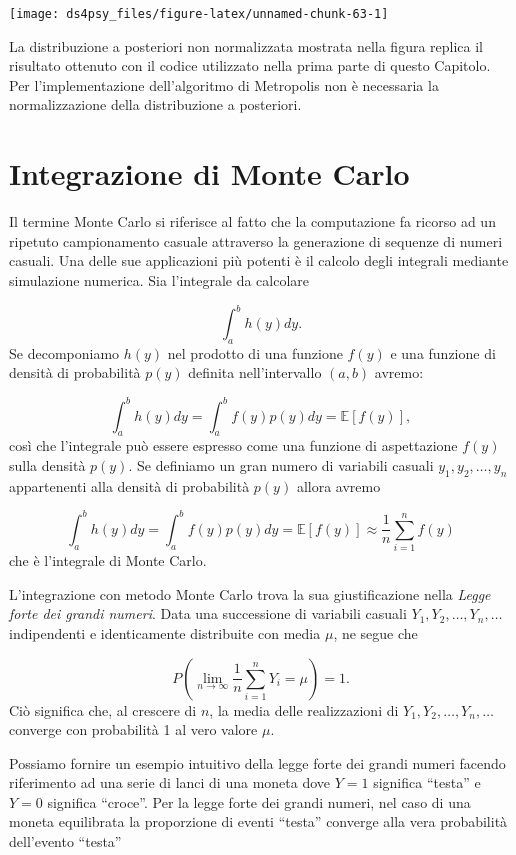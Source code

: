 \documentclass[
  11pt,
]{krantz}
\newcommand{\E}{\mathbb{E}} %
\theoremstyle{definition}
\theoremstyle{definition}
\theoremstyle{definition}
\theoremstyle{definition}
\theoremstyle{remark}
\begin{document}
\begin{center}\texttt{[image: ds4psy\_files/figure-latex/unnamed-chunk-63-1]} \end{center}

La distribuzione a posteriori non normalizzata mostrata nella figura replica il risultato ottenuto con il codice utilizzato nella prima parte di questo Capitolo. Per l'implementazione dell'algoritmo di Metropolis non è necessaria la normalizzazione della distribuzione a posteriori.

\hypertarget{integration-mc}{%
\chapter{Integrazione di Monte Carlo}\label{integration-mc}}

Il termine Monte Carlo si riferisce al fatto che la computazione fa ricorso ad un ripetuto campionamento casuale attraverso la generazione di sequenze di numeri casuali. Una delle sue applicazioni più potenti è il calcolo degli integrali mediante simulazione numerica. Sia l'integrale da calcolare

\[
\int_a^b h(y) dy.
\] Se decomponiamo \(h(y)\) nel prodotto di una funzione \(f(y)\) e una funzione di densità di probabilità \(p(y)\) definita nell'intervallo \((a, b)\) avremo:

\[
\int_a^b h(y) dy = \int_a^b f(y) p(y) dy = \E[f(y)],
\] così che l'integrale può essere espresso come una funzione di aspettazione \(f(y)\) sulla densità \(p(y)\). Se definiamo un gran numero di variabili casuali \(y_1, y_2, \dots, y_n\) appartenenti alla densità di probabilità \(p(y)\) allora avremo

\[
\int_a^b h(y) dy = \int_a^b f(y) p(y) dy = \E[f(y)] \approx \frac{1}{n}\sum_{i=1}^n f(y)
\] che è l'integrale di Monte Carlo.

L'integrazione con metodo Monte Carlo trova la sua giustificazione nella \emph{Legge forte dei grandi numeri}. Data una successione di variabili casuali \(Y_{1}, Y_{2},\dots, Y_{n},\dots\) indipendenti e identicamente distribuite con media \(\mu\), ne segue che

\[
P\left( \lim_{n \rightarrow \infty} \frac{1}{n} \sum_{i=1}^n Y_i = \mu \right) = 1.
\] Ciò significa che, al crescere di \(n\), la media delle realizzazioni di \(Y_{1}, Y_{2},\dots, Y_{n},\dots\) converge con probabilità 1 al vero valore \(\mu\).

Possiamo fornire un esempio intuitivo della legge forte dei grandi numeri facendo riferimento ad una serie di lanci di una moneta dove \(Y=1\) significa ``testa'' e \(Y=0\) significa ``croce''. Per la legge forte dei grandi numeri, nel caso di una moneta equilibrata la proporzione di eventi ``testa'' converge alla vera probabilità dell'evento ``testa''
\end{document}
